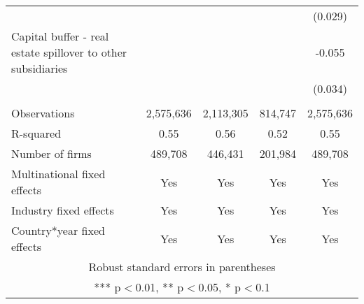 \begin{tabular}{lcccc}
 &  &  &  & (0.029) \\
Capital buffer - real estate spillover to other subsidiaries &  &  &  & -0.055 \\
 &  &  &  & (0.034) \\
 &  &  &  &  \\
Observations & 2,575,636 & 2,113,305 & 814,747 & 2,575,636 \\
R-squared & 0.55 & 0.56 & 0.52 & 0.55 \\
Number of firms & 489,708 & 446,431 & 201,984 & 489,708 \\
Multinational fixed effects & Yes & Yes & Yes & Yes \\
Industry fixed effects & Yes & Yes & Yes & Yes \\
 Country*year fixed effects & Yes & Yes & Yes & Yes \\ \hline
\multicolumn{5}{c}{ Robust standard errors in parentheses} \\
\multicolumn{5}{c}{ *** p$<$0.01, ** p$<$0.05, * p$<$0.1} \\
\end{tabular}
